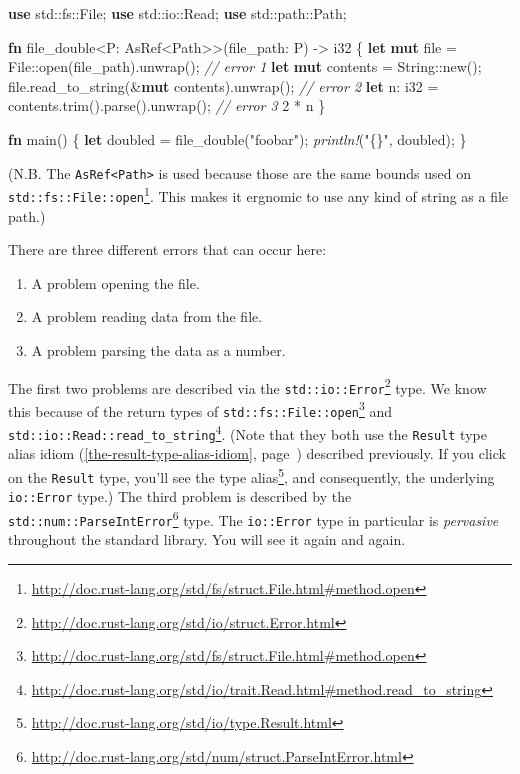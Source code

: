 \documentclass[a4paper,]{book}
\renewcommand*{\hyperref}[2][\ar]{%
  \def\ar{#2}%
  #2 (\autoref{#1}, page~\pageref{#1})}
\newenvironment{Shaded}{\begin{snugshade}}{\end{snugshade}}
\newcommand{\KeywordTok}[1]{\textcolor[rgb]{0.13,0.29,0.53}{\textbf{{#1}}}}
\newcommand{\DataTypeTok}[1]{\textcolor[rgb]{0.13,0.29,0.53}{{#1}}}
\newcommand{\DecValTok}[1]{\textcolor[rgb]{0.00,0.00,0.81}{{#1}}}
\newcommand{\StringTok}[1]{\textcolor[rgb]{0.31,0.60,0.02}{{#1}}}
\newcommand{\CommentTok}[1]{\textcolor[rgb]{0.56,0.35,0.01}{\textit{{#1}}}}
\newcommand{\PreprocessorTok}[1]{\textcolor[rgb]{0.56,0.35,0.01}{\textit{{#1}}}}
\newcommand{\NormalTok}[1]{{#1}}
\renewcommand{\href}[2]{#2\footnote{\url{#1}}}
\providecommand{\tightlist}{%
  \setlength{\itemsep}{0pt}\setlength{\parskip}{0pt}}
\begin{document}
\begin{Shaded}
\begin{Highlighting}[]
\KeywordTok{use} \NormalTok{std::fs::File;}
\KeywordTok{use} \NormalTok{std::io::Read;}
\KeywordTok{use} \NormalTok{std::path::Path;}

\KeywordTok{fn} \NormalTok{file_double<P: AsRef<Path>>(file_path: P) -> }\DataTypeTok{i32} \NormalTok{\{}
    \KeywordTok{let} \KeywordTok{mut} \NormalTok{file = File::open(file_path).unwrap(); }\CommentTok{// error 1}
    \KeywordTok{let} \KeywordTok{mut} \NormalTok{contents = }\DataTypeTok{String}\NormalTok{::new();}
    \NormalTok{file.read_to_string(&}\KeywordTok{mut} \NormalTok{contents).unwrap(); }\CommentTok{// error 2}
    \KeywordTok{let} \NormalTok{n: }\DataTypeTok{i32} \NormalTok{= contents.trim().parse().unwrap(); }\CommentTok{// error 3}
    \DecValTok{2} \NormalTok{* n}
\NormalTok{\}}

\KeywordTok{fn} \NormalTok{main() \{}
    \KeywordTok{let} \NormalTok{doubled = file_double(}\StringTok{"foobar"}\NormalTok{);}
    \PreprocessorTok{println!}\NormalTok{(}\StringTok{"\{\}"}\NormalTok{, doubled);}
\NormalTok{\}}
\end{Highlighting}
\end{Shaded}

(N.B. The \texttt{AsRef\textless{}Path\textgreater{}} is used because
those are the
\href{http://doc.rust-lang.org/std/fs/struct.File.html\#method.open}{same
bounds used on \texttt{std::fs::File::open}}. This makes it ergnomic to
use any kind of string as a file path.)

There are three different errors that can occur here:

\begin{enumerate}
\def\labelenumi{\arabic{enumi}.}
\tightlist
\item
  A problem opening the file.
\item
  A problem reading data from the file.
\item
  A problem parsing the data as a number.
\end{enumerate}

The first two problems are described via the
\href{http://doc.rust-lang.org/std/io/struct.Error.html}{\texttt{std::io::Error}}
type. We know this because of the return types of
\href{http://doc.rust-lang.org/std/fs/struct.File.html\#method.open}{\texttt{std::fs::File::open}}
and
\href{http://doc.rust-lang.org/std/io/trait.Read.html\#method.read_to_string}{\texttt{std::io::Read::read\_to\_string}}.
(Note that they both use the
\hyperref[the-result-type-alias-idiom]{\texttt{Result} type alias idiom}
described previously. If you click on the \texttt{Result} type, you'll
\href{http://doc.rust-lang.org/std/io/type.Result.html}{see the type
alias}, and consequently, the underlying \texttt{io::Error} type.) The
third problem is described by the
\href{http://doc.rust-lang.org/std/num/struct.ParseIntError.html}{\texttt{std::num::ParseIntError}}
type. The \texttt{io::Error} type in particular is \emph{pervasive}
throughout the standard library. You will see it again and again.
\end{document}

